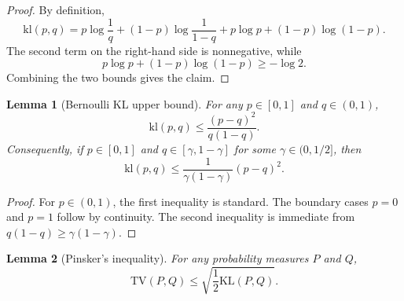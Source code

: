 \documentclass[11pt]{article}
\newtheorem{lemma}{Lemma}
\begin{document}
\begin{proof}
By definition,
\[
\mathrm{kl}(p,q)
=
p\log\frac1q+(1-p)\log\frac1{1-q}+p\log p+(1-p)\log(1-p).
\]
The second term on the right-hand side is nonnegative, while
\[
p\log p+(1-p)\log(1-p)\ge -\log 2.
\]
Combining the two bounds gives the claim.
\end{proof}

\begin{lemma}[Bernoulli KL upper bound]
\label{lem:bernoulli-kl-upper}
For any $p\in[0,1]$ and $q\in(0,1)$,
\[
\mathrm{kl}(p,q)\le \frac{(p-q)^2}{q(1-q)}.
\]
Consequently, if $p\in[0,1]$ and $q\in[\gamma,1-\gamma]$ for some
$\gamma\in(0,1/2]$, then
\[
\mathrm{kl}(p,q)\le \frac{1}{\gamma(1-\gamma)}(p-q)^2.
\]
\end{lemma}

\begin{proof}
For $p\in(0,1)$, the first inequality is standard. The boundary cases
$p=0$ and $p=1$ follow by continuity. The second inequality is immediate from
$q(1-q)\ge \gamma(1-\gamma)$.
\end{proof}

\begin{lemma}[Pinsker's inequality]
\label{lem:pinsker}
For any probability measures $P$ and $Q$,
\[
\mathrm{TV}(P,Q)\le \sqrt{\frac12 \mathrm{KL}(P,Q)}.
\]
\end{lemma}
\end{document}
